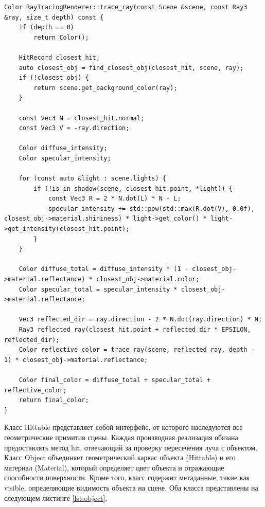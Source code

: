 \begin{lstlisting}[caption={Метод trace\_ray класса RayTracingRenderer}, label={lst:trace-ray}]
Color RayTracingRenderer::trace_ray(const Scene &scene, const Ray3 &ray, size_t depth) const {
    if (depth == 0)
        return Color();

    HitRecord closest_hit;
    auto closest_obj = find_closest_obj(closest_hit, scene, ray);
    if (!closest_obj) {
        return scene.get_background_color(ray);
    }

    const Vec3 N = closest_hit.normal;
    const Vec3 V = -ray.direction;

    Color diffuse_intensity;
    Color specular_intensity;

    for (const auto &light : scene.lights) {
        if (!is_in_shadow(scene, closest_hit.point, *light)) {
            const Vec3 R = 2 * N.dot(L) * N - L;
            specular_intensity += std::pow(std::max(R.dot(V), 0.0f), closest_obj->material.shininess) * light->get_color() * light->get_intensity(closest_hit.point);
        }
    }

    Color diffuse_total = diffuse_intensity * (1 - closest_obj->material.reflectance) * closest_obj->material.color;
    Color specular_total = specular_intensity * closest_obj->material.reflectance;

    Vec3 reflected_dir = ray.direction - 2 * N.dot(ray.direction) * N;
    Ray3 reflected_ray(closest_hit.point + reflected_dir * EPSILON, reflected_dir);
    Color reflective_color = trace_ray(scene, reflected_ray, depth - 1) * closest_obj->material.reflectance;

    Color final_color = diffuse_total + specular_total + reflective_color;
    return final_color;
}
\end{lstlisting}

Класс Hittable представляет собой интерфейс, от которого наследуются все геометрические примитив сцены. Каждая производная реализация обязана предоставлять метод hit, отвечающий за проверку пересечения луча с объектом. Класс Object объединяет геометрический каркас объекта (Hittable) и его материал (Material), который определяет цвет объекта и отражающие способности поверхности. Кроме того, класс содержит метаданные, такие как visible, определяющие видимость объекта на сцене. Оба класса представлены на следующем листинге \ref{lst:object}.

